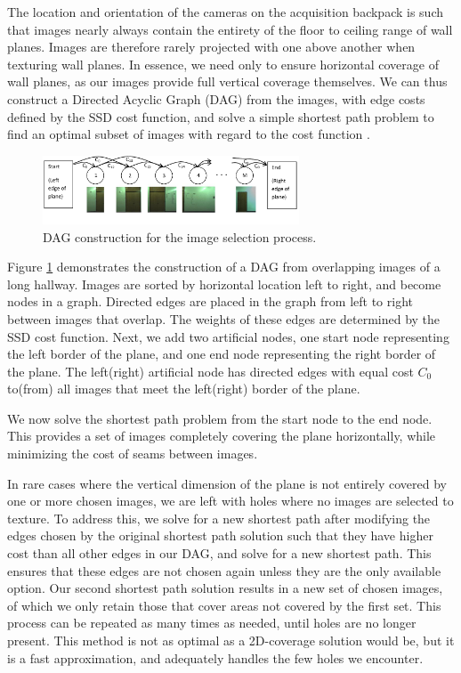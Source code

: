 \documentclass[10pt,twocolumn,letterpaper]{article}
\begin{document}
The location and orientation of the cameras on the acquisition
backpack is such that images nearly always contain the entirety of the
floor to ceiling range of wall planes. Images are therefore rarely
projected with one above another when texturing wall planes. In
essence, we need only to ensure horizontal coverage of wall planes, as
our images provide full vertical coverage themselves. We can thus
construct a Directed Acyclic Graph (DAG) from the images, with edge
costs defined by the SSD cost function, and solve a simple shortest
path problem to find an optimal subset of images with regard to the
cost function \cite{dijkstra}.

\begin{figure}
  \centering
  \includegraphics[width=3in]{dagCreation.pdf}
  \caption{DAG construction for the image selection process.}
  \label{fig:dagCreation}
\end{figure}

Figure \ref{fig:dagCreation} demonstrates the construction of a DAG
from overlapping images of a long hallway. Images are sorted by
horizontal location left to right, and become nodes in a
graph. Directed edges are placed in the graph from left to right
between images that overlap. The weights of these edges are determined
by the SSD cost function. Next, we add two
artificial nodes, one start node representing the left border of the
plane, and one end node representing the right border of the
plane. The left(right) artificial node has directed edges with equal
cost $C_0$ to(from) all images that meet the left(right) border of the
plane.

We now solve the shortest path problem from the start node to the end
node. This provides a set of images completely covering the plane
horizontally, while minimizing the cost of seams between images.

In rare cases where the vertical dimension of the plane is not
entirely covered by one or more chosen images, we are left with holes
where no images are selected to texture. To address this, we solve for a new shortest path after modifying the edges chosen by the original shortest path solution such that they
have higher cost than all other edges in our DAG, and solve for a new
shortest path. This ensures that these edges are not chosen again
unless they are the only available option. Our second shortest path
solution results in a new set of chosen images, of which we only
retain those that cover areas not covered by the first set. This
process can be repeated as many times as needed, until holes are no
longer present. This method is not as optimal as a 2D-coverage
solution would be, but it is a fast approximation, and adequately
handles the few holes we encounter.
\end{document}
